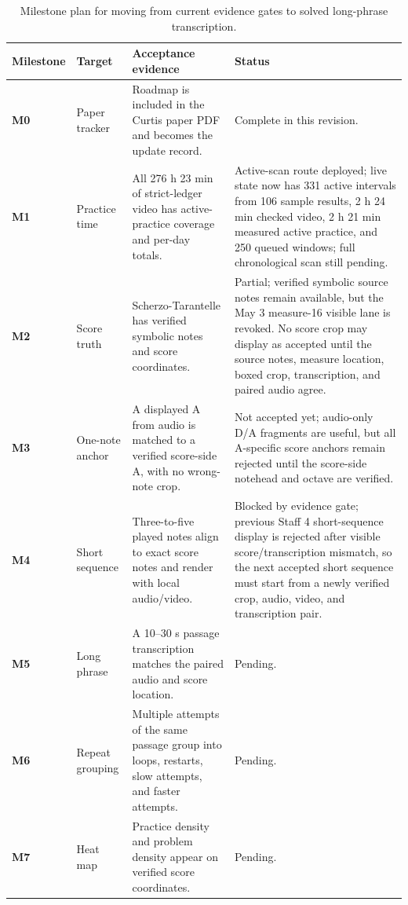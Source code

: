 \begin{table}[htbp]
\centering
\scriptsize
\setlength{\tabcolsep}{4pt}
\renewcommand{\arraystretch}{1.1}
\caption{Milestone plan for moving from current evidence gates to solved long-phrase transcription.}
\label{tab:roadmap_milestones}
\begin{tabularx}{\textwidth}{>{\bfseries}p{}p{}X p{}}
\toprule
Milestone & Target & Acceptance evidence & Status \\
\midrule
M0 & Paper tracker & Roadmap is included in the Curtis paper PDF and becomes the update record. & Complete in this revision. \\
M1 & Practice time & All 276 h 23 min of strict-ledger video has active-practice coverage and per-day totals. & Active-scan route deployed; live state now has 331 active intervals from 106 sample results, 2 h 24 min checked video, 2 h 21 min measured active practice, and 250 queued windows; full chronological scan still pending. \\
M2 & Score truth & Scherzo-Tarantelle has verified symbolic notes and score coordinates. & Partial; verified symbolic source notes remain available, but the May 3 measure-16 visible lane is revoked. No score crop may display as accepted until the source notes, measure location, boxed crop, transcription, and paired audio agree. \\
M3 & One-note anchor & A displayed A from audio is matched to a verified score-side A, with no wrong-note crop. & Not accepted yet; audio-only D/A fragments are useful, but all A-specific score anchors remain rejected until the score-side notehead and octave are verified. \\
M4 & Short sequence & Three-to-five played notes align to exact score notes and render with local audio/video. & Blocked by evidence gate; previous Staff 4 short-sequence display is rejected after visible score/transcription mismatch, so the next accepted short sequence must start from a newly verified crop, audio, video, and transcription pair. \\
M5 & Long phrase & A 10--30 s passage transcription matches the paired audio and score location. & Pending. \\
M6 & Repeat grouping & Multiple attempts of the same passage group into loops, restarts, slow attempts, and faster attempts. & Pending. \\
M7 & Heat map & Practice density and problem density appear on verified score coordinates. & Pending. \\

\end{tabularx}
\end{table}
